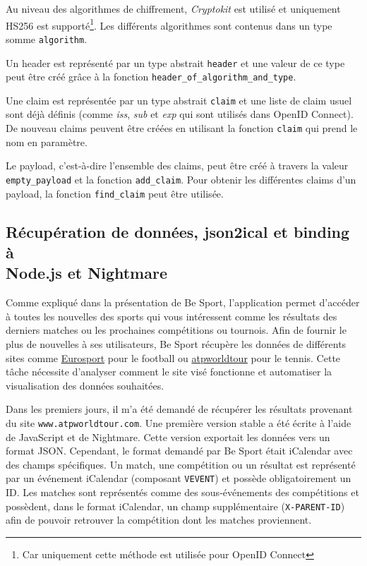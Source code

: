 Au niveau des algorithmes de chiffrement,
\textit{Cryptokit}\cite{ocaml-cryptokit-ocaml-forge} est utilisé et uniquement
HS256 est supporté\footnote{Car uniquement cette méthode est utilisée pour OpenID
  Connect}. Les différents algorithmes sont contenus dans un type somme \verb|algorithm|.

Un header est représenté par un type abstrait \verb|header| et une valeur de ce
type peut être créé grâce à la fonction \verb|header_of_algorithm_and_type|.

Une claim est représentée par un type abstrait \verb|claim| et une liste de
claim usuel sont déjà définis (comme \emph{iss}, \emph{sub} et \emph{exp} qui
sont utilisés dans OpenID Connect). De nouveau claims peuvent être créées en
utilisant la fonction \verb|claim| qui prend le nom en paramètre. 

Le payload, c'est-à-dire l'ensemble des claims, peut être créé à travers la
valeur \verb|empty_payload| et la fonction \verb|add_claim|.
Pour obtenir les différentes claims d'un payload, la fonction \verb|find_claim|
peut être utilisée.

\subsection{Récupération de données, json2ical et binding à \\ Node.js  et Nightmare}

Comme expliqué dans la présentation de Be Sport, l'application permet d'accéder
à toutes les nouvelles des sports qui vous intéressent comme les résultats des
derniers matches ou les prochaines compétitions ou tournois.
Afin de fournir le plus de nouvelles à ses utilisateurs, Be Sport récupère les
données de différents sites comme \href{https://eurosport.fr}{Eurosport} pour le
football ou \href{https://atpworldtour.com}{atpworldtour} pour le tennis.
Cette tâche nécessite d'analyser comment le site visé fonctionne et automatiser
la visualisation des données souhaitées.

Dans les premiers jours, il m'a été demandé de récupérer les résultats provenant
du site \verb|www.atpworldtour.com|.
Une première version stable a été écrite à l'aide de JavaScript et de
Nightmare\cite{nightmare-website}. Cette version exportait les données vers un
format JSON. Cependant, le format demandé par Be Sport était
iCalendar avec des champs spécifiques.
Un match, une compétition ou un résultat est représenté par un événement
iCalendar (composant \verb|VEVENT|) et possède obligatoirement un ID. Les
matches sont représentés comme des sous-événements des compétitions et
possèdent, dans le format iCalendar, un champ supplémentaire
(\verb|X-PARENT-ID|) afin de pouvoir retrouver la compétition dont les matches
proviennent.

